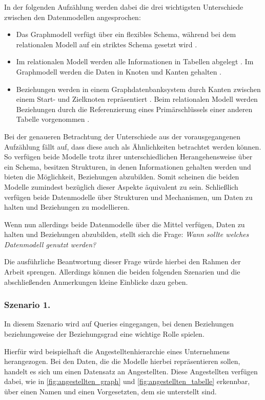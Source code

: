 In der folgenden Aufzählung werden dabei die drei wichtigsten Unterschiede zwischen den Datenmodellen angesprochen:
\begin{itemize}
    \item Das Graphmodell verfügt über ein flexibles Schema, während bei dem relationalen Modell auf ein striktes Schema gesetzt wird \cite{gdbms,rdbms_book}.
    \item Im relationalen Modell werden alle Informationen in Tabellen abgelegt \cite{rdbms_book}. Im Graphmodell werden die Daten in Knoten und Kanten gehalten \cite{gdbms}. 
    \item Beziehungen werden in einem Graphdatenbanksystem durch Kanten zwischen einem Start- und Zielknoten repräsentiert \cite{gdbms}. Beim relationalen Modell werden Beziehungen durch die Referenzierung eines Primärschlüssels einer anderen Tabelle vorgenommen \cite{rdbms_book}. 
\end{itemize}
Bei der genaueren Betrachtung der Unterschiede aus der vorausgegangenen Aufzählung fällt auf, dass diese auch als Ähnlichkeiten betrachtet werden können. So verfügen beide Modelle trotz ihrer unterschiedlichen Herangehensweise über ein Schema, besitzen Strukturen, in denen Informationen gehalten werden und bieten die Möglichkeit, Beziehungen abzubilden. Somit scheinen die beiden Modelle zumindest bezüglich dieser Aspekte äquivalent zu sein. Schließlich verfügen beide Datenmodelle über Strukturen und Mechanismen, um Daten zu halten und Beziehungen zu modellieren. 

Wenn nun allerdings beide Datenmodelle über die Mittel verfügen, Daten zu halten und Beziehungen abzubilden, stellt sich die Frage: \textit{Wann sollte welches Datenmodell genutzt werden?}

Die ausführliche Beantwortung dieser Frage würde hierbei den Rahmen der Arbeit sprengen. Allerdings können die beiden folgenden Szenarien und die abschließenden Anmerkungen kleine Einblicke dazu geben. 

\subsubsection{Szenario 1.}
In diesem Szenario wird auf Queries eingegangen, bei denen Beziehungen beziehungsweise der Beziehungsgrad eine wichtige Rolle spielen. 

Hierfür wird beispielhaft die Angestelltenhierarchie eines Unternehmens herangezogen. Bei den Daten, die die Modelle hierbei repräsentieren sollen, handelt es sich um einen Datensatz an Angestellten. Diese Angestellten verfügen dabei, wie in \autoref{fig:angestellten_graph} und \autoref{fig:angestellten_tabelle} erkennbar, über einen Namen und einen Vorgesetzten, dem sie unterstellt sind. 

